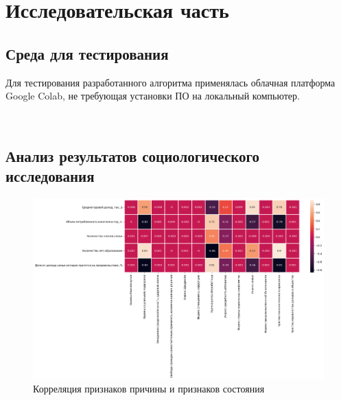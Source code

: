 \chapter{Исследовательская часть}

\section{Среда для тестирования}

Для тестирования разработанного алгоритма применялась облачная платформа Google Colab, не требующая установки ПО на локальный компьютер.

% 
\
\section{Анализ результатов социологического исследования}

\begin{figure}
	\begin{center}
		\includegraphics[width=\textwidth]{images/1.png}
	\end{center}
	\caption{Корреляция признаков причины и признаков состояния}
	\label{img:1}
\end{figure}

